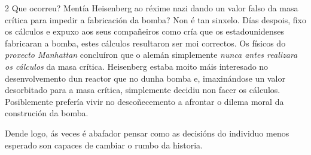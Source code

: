 \begin{multicols}{2}
Que ocorreu? Mentía Heisenberg ao réxime nazi dando un valor falso da masa
crítica para impedir a fabricación da bomba? Non é tan sinxelo. Días despois,
fixo os cálculos e expuxo aos seus compañeiros como cría que os estadounidenses
fabricaran a bomba, estes cálculos resultaron ser moi correctos. Os físicos do
\textit{proxecto Manhattan} concluíron que o alemán simplemente \textit{nunca
antes realizara os cálculos} da masa crítica. Heisenberg estaba moito máis
interesado no desenvolvemento dun reactor que no dunha bomba e, imaxinándose un
valor desorbitado para a masa crítica, simplemente decidiu non facer os
cálculos. Posiblemente prefería vivir no descoñecemento a afrontar o dilema
moral da construción da bomba.

Dende logo, ás veces é abafador pensar como as decisións do individuo menos
esperado son capaces de cambiar o rumbo da historia.

\nocite{gottstein.k_2016}
\nocite{dawidoff.n_2011}

\printbibliography

\end{multicols}
